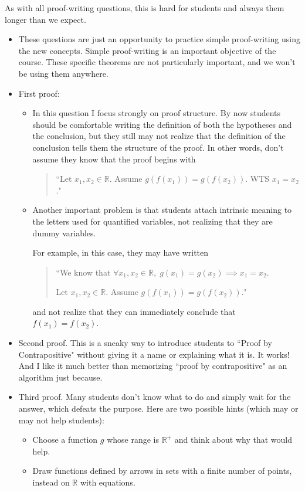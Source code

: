 \documentclass[11pt]{article}
\newcommand {\DS} [1] {${\displaystyle #1}$}
\newcommand{\R}{\mathbb{R}}
\newcommand{\nl}{\hfill \vspace{-1.1\baselineskip}} %
\begin{document}
\begin{warning}
	As with all proof-writing questions, this is hard for students and always them longer than we expect.
\end{warning}
\begin{comments}
\nl
\begin{itemize}
	\item These questions are just an opportunity to practice simple proof-writing using the new concepts.  Simple proof-writing is an important objective of the course.  These specific theorems are not particularly important, and we won't be using them anywhere.
	\item First proof:	
		\begin{itemize}
			\item  In this question I focus strongly on proof structure.  By now students should be comfortable writing the definition of both the hypotheses and the conclusion, but they still may not realize that the definition of the conclusion tells them the structure of the proof.   In other words, don't assume they know that the proof begins with 
				\begin{quote} ``Let $x_1, x_2 \in \mathbb{R}$.  Assume $g(f(x_1)) = g(f(x_2))$.  WTS $x_1 = x_2$."\end{quote}
			\item Another important problem is that students attach intrinsic meaning to the letters used for quantified variables, not realizing that they are dummy variables.
			
				For example, in this case, they may have written 
					\begin{quote}
						``We know that \DS{\forall x_1, x_2 \in \mathbb{R}, \; g(x_1) = g(x_2) \implies x_1 = x_2}.
						
						Let \DS{x_1, x_2 \in \mathbb{R}}.  Assume \DS{g(f(x_1)) = g(f(x_2))}."
					\end{quote}
				and not realize that they can immediately conclude that \DS{f(x_1) = f(x_2)}.
		\end{itemize}
	\item Second proof.  This is a sneaky way to introduce students to ``Proof by Contrapositive" without giving it a name or explaining what it is.   It works!  And I like it much better than memorizing ``proof by contrapositive" as an algorithm just because.
	\item Third proof.   
	Many students don't know what to do and simply wait for the answer, which defeats the purpose. Here are two possible hints (which may or may not help students):
		\begin{itemize}
			\item Choose a function $g$ whose range is $\R^+$ and think about why that would help.
			\item  Draw functions defined by arrows in sets with a finite number of points, instead on $\mathbb{R}$ with equations.
		\end{itemize}
\end{itemize}	
\end{comments}
\end{document}
